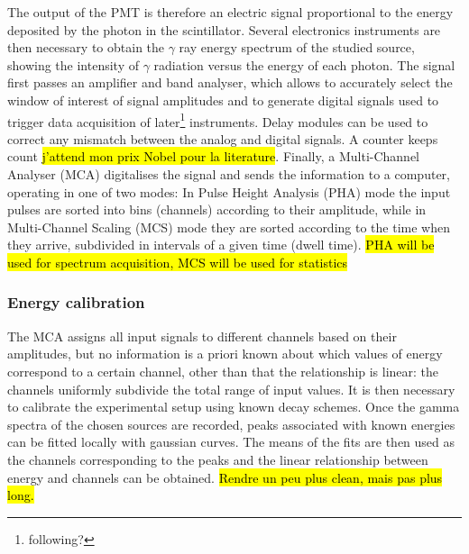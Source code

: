 The output of the PMT is therefore an electric signal proportional to the energy deposited by the photon in the scintillator.
Several electronics instruments are then necessary to obtain the $\gamma$ ray energy spectrum of the studied source, 
showing the intensity of $\gamma$ radiation versus the energy of each photon.
The signal first passes an amplifier and band analyser, which allows to accurately select the window of interest of signal amplitudes and to generate digital signals used to trigger data acquisition of later\footnote{following?} instruments.
Delay modules can be used to correct any mismatch between the analog and digital signals\footnotemark.
A counter keeps count \hl{j'attend mon prix Nobel pour la literature}.
Finally, a Multi-Channel Analyser (MCA) digitalises the signal and sends the information to a computer, operating in one of two modes:
In Pulse Height Analysis (PHA) mode the input pulses are
sorted into bins (channels) according to their amplitude, while in Multi-Channel Scaling (MCS) mode they are sorted according to the time when they arrive, subdivided in intervals of a given time (dwell time).
\hl{PHA will be used for spectrum acquisition, MCS will be used for statistics}


\subsubsection{Energy calibration}
\label{sec:energy_calibration}

The MCA assigns all input signals to different channels based on their amplitudes, 
but no information is a priori known about which values of energy correspond to a certain channel,
other than that the relationship is linear: 
the channels uniformly subdivide the total range of input values.
It is then necessary to calibrate the experimental setup using known decay schemes.
Once the gamma spectra of the chosen sources are recorded, peaks associated with known energies can be fitted locally with gaussian curves.
The means of the fits are then used as the channels corresponding to the peaks and the linear relationship between energy and channels can be obtained. \hl{Rendre un peu plus clean, mais pas plus long.}


